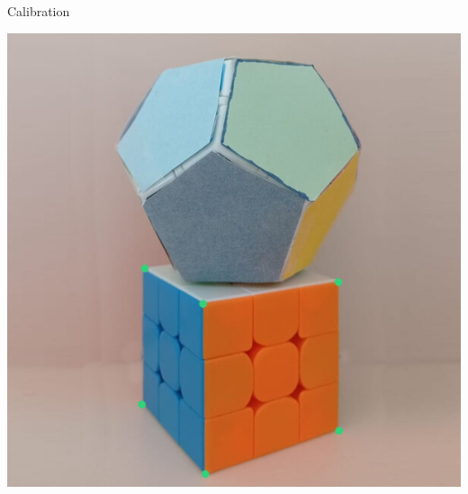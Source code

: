 \begin{frame}{Calibration}
\begin{minipage}{0.32\linewidth}
  \end{minipage}
  \hfill
  \begin{minipage}{0.6\linewidth}
    \centering
    \includegraphics[width=0.9\linewidth]{capture/selection.png}
  \end{minipage}
\end{frame}
